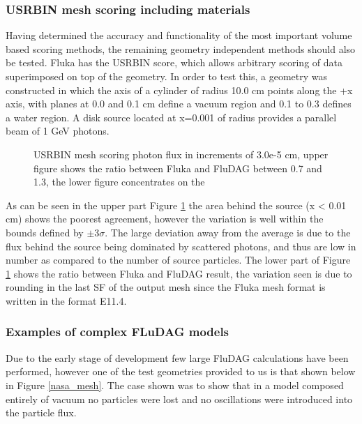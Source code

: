 \documentclass{anstrans}
\begin{document}
\subsubsection*{USRBIN mesh scoring including materials}
Having determined the accuracy and functionality of the most important 
volume based scoring methods, the remaining geometry independent methods
should also be tested.
Fluka has the USRBIN score, which allows arbitrary scoring
of data superimposed on top of the geometry. In order to test this, a geometry
was constructed in which the axis of a cylinder of radius 10.0 cm points along the
+x axis, with planes at 0.0 and 0.1 cm define a vacuum region and 0.1 to 0.3 
defines a water region. A disk  source located at x=0.001 of radius provides a 
parallel beam of 1 GeV photons.
\begin{figure}[h!]
	\begin{center}
		\caption{USRBIN mesh scoring photon flux in increments
                  of 3.0e-5 cm, upper figure shows the ratio between
                  Fluka and FluDAG between 0.7 and 1.3, the lower
                  figure concentrates on the }
	\end{center}
	\label{mesh_phot}
\end{figure}
As can be seen in the upper part Figure \ref{mesh_phot} the area behind the source 
(x < 0.01 cm) shows the poorest agreement, however the variation is well within the 
bounds defined by $\pm 3\sigma$. The large deviation away from the average is due to 
the flux behind the source being dominated by scattered photons, and thus are low in 
number as compared to the number of source particles.  The lower part of Figure 
\ref{mesh_phot} shows the ratio between Fluka and FluDAG result, the variation seen is 
due to rounding in the last SF of the output mesh since the Fluka mesh format is written 
 in the format E11.4. 

\subsubsection{Examples of complex FLuDAG models}
Due to the early stage of development few large FluDAG calculations have been performed, however
one of the test geometries provided to us is that shown below in Figure \ref{nasa_mesh}. The case shown
was to show that in a model composed entirely of vacuum no particles were lost and no oscillations were
introduced into the particle flux.
\end{document}
